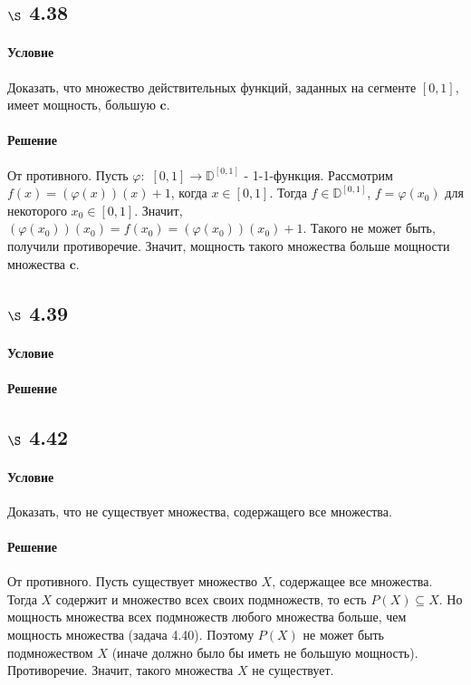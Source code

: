 \documentclass[a4paper,12pt]{article}
\begin{document}
\subsection*{$\S$ 4.38}
\paragraph*{Условие}
Доказать, что множество действительных функций, заданных на сегменте $[0,1]$, имеет мощность, большую $\textbf{c}$.
\paragraph*{Решение}
От противного. Пусть $\varphi:$ $[0,1]\to \mathbb{D}^{[0,1]}$ - 1-1-функция. Рассмотрим $f(x)=(\varphi(x))(x)+1$, когда $x\in [0,1]$. Тогда $f\in \mathbb{D}^{[0,1]}$, $f=\varphi(x_0)$ для некоторого $x_0 \in [0,1]$. Значит, $(\varphi(x_0))(x_0) = f(x_0) = (\varphi(x_0))(x_0)+1$. Такого не может быть, получили противоречие. Значит, мощность такого множества больше мощности множества $\textbf{c}$.

\subsection*{$\S$ 4.39}
\paragraph*{Условие}
\paragraph*{Решение}

\subsection*{$\S$ 4.42}
\paragraph*{Условие}
Доказать, что не существует множества, содержащего все множества.
\paragraph*{Решение}
От противного. Пусть существует множество $X$, содержащее все множества. Тогда $X$ содержит и множество всех своих подмножеств, то есть $P(X)\subseteq X$. Но мощность множества всех подмножеств любого множества больше, чем мощность множества (задача 4.40). Поэтому $P(X)$ не может быть подмножеством $X$ (иначе должно было бы иметь не большую мощность). Противоречие. Значит, такого множества $X$ не существует.
\end{document}
